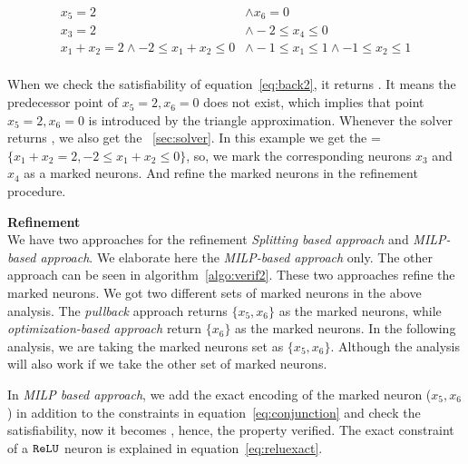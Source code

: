 \begin{equation}
    \begin{aligned}
        x_5 = 2 & \land x_6 = 0 \\
        x_3 = 2 & \land -2\leq x_4 \leq 0 \\ 
        x_1+x_2=2\land -2\leq  x_1+x_2 \leq 0 & \land -1\leq x_1 \leq 1 \land -1\leq x_2 \leq 1 \\
    \end{aligned}
\label{eq:back2}
\end{equation}

When we check the satisfiability of equation~\ref{eq:back2}, it returns \unsat{}. It means the predecessor point of 
$x_5=2,x_6=0$ does not exist, which implies that point $x_5=2, x_6=0$ is introduced by the triangle approximation.
Whenever the solver returns \unsat{}, we also get the \unsatcore{}~\ref{sec:solver}. In this example we get the 
\unsatcore{}=$\{x_1+x_2=2, -2\leq  x_1+x_2 \leq 0\}$, so, we mark the corresponding neurons $x_3$ and $x_4$ as a marked neurons. 
And refine the marked neurons in the refinement procedure. 


\textbf{Refinement} \\
We have two approaches for the refinement {\em Splitting based approach} and {\em MILP-based approach}.
We elaborate here the {\em MILP-based approach} only. The other approach can be seen in algorithm~\ref{algo:verif2}. 
These two approaches refine the marked neurons. We got two different sets of marked neurons in the above analysis. 
The {\em pullback} approach returns $\{x_5, x_6\}$ as the marked neurons, while {\em optimization-based approach}
return $\{x_6\}$ as the marked neurons. In the following analysis, we are taking the marked neurons set as $\{x_5, x_6\}$.
Although the analysis will also work if we take the other set of marked neurons.

In {\em MILP based approach}, we add the exact encoding of the marked neuron ($x_5, x_6$) in addition to the constraints
in equation~\ref{eq:conjunction} and check the satisfiability, now it becomes \unsat{}, hence, the property verified. 
The exact constraint of a $\mathtt{ReLU}${} neuron is explained in equation~\ref{eq:reluexact}. 

